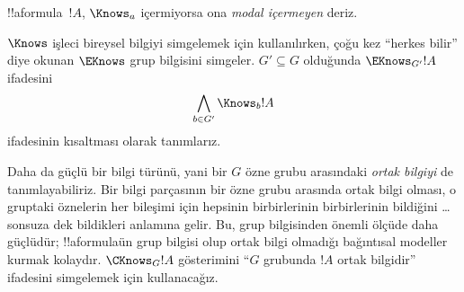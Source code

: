 \documentclass[../../../include/open-logic-section]{subfiles}
\begin{document}
!!a{formula}~$!A$, $\Knows_a$ içermiyorsa ona \emph{modal içermeyen} deriz.

\begin{defn}
  $\Knows$ işleci bireysel bilgiyi simgelemek için kullanılırken, çoğu kez
  ``herkes bilir'' diye okunan $\EKnows$ grup bilgisini simgeler. $G' \subseteq
  G$ olduğunda $\EKnows_{G'} !A$ ifadesini
  \[\bigwedge_{b \in G'} \Knows_b !A\]
  ifadesinin kısaltması olarak tanımlarız.
\end{defn}

Daha da güçlü bir bilgi türünü, yani bir $G$ özne grubu arasındaki
\emph{ortak bilgiyi} de tanımlayabiliriz. Bir bilgi parçasının bir özne grubu
arasında ortak bilgi olması, o gruptaki öznelerin her bileşimi için hepsinin
birbirlerinin birbirlerinin bildiğini \dots sonsuza dek bildikleri anlamına
gelir. Bu, grup bilgisinden önemli ölçüde daha güçlüdür; !!a{formula}{}ün grup
bilgisi olup ortak bilgi olmadığı bağıntısal modeller kurmak kolaydır.
$\CKnows_G !A$ gösterimini ``$G$ grubunda $!A$ ortak bilgidir'' ifadesini
simgelemek için kullanacağız.
\end{document}
